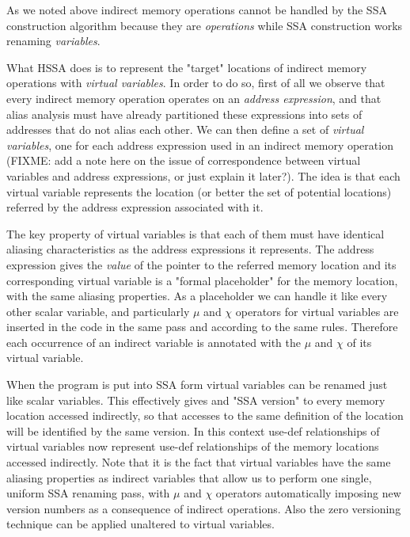 As we noted above indirect memory operations cannot be handled by the SSA construction algorithm because they are {\em operations} while SSA construction works renaming {\em variables}.

What HSSA does is to represent the "target" locations of indirect memory operations with {\em virtual variables}.
In order to do so, first of all we observe that every indirect memory operation operates on an {\em address expression}, and that alias analysis must have already partitioned these expressions into sets of addresses that do not alias each other.
We can then define a set of {\em virtual variables}, one for each address expression used in an indirect memory operation (FIXME: add a note here on the issue of correspondence between virtual variables and address expressions, or just explain it later?).
The idea is that each virtual variable represents the location (or better the set of potential locations) referred by the address expression associated with it.

The key property of virtual variables is that each of them must have identical aliasing characteristics as the address expressions it represents.
The address expression gives the {\em value} of the pointer to the referred memory location and its corresponding virtual variable is a "formal placeholder" for the memory location, with the same aliasing properties.
As a placeholder we can handle it like every other scalar variable, and particularly $\mu$ and $\chi$ operators for virtual variables are inserted in the code in the same pass and according to the same rules.
Therefore each occurrence of an indirect variable is annotated with the $\mu$ and $\chi$ of its virtual variable.

When the program is put into SSA form virtual variables can be renamed just like scalar variables.
This effectively gives and "SSA version" to every memory location accessed indirectly, so that accesses to the same definition of the location will be identified by the same version.
In this context use-def relationships of virtual variables now represent use-def relationships of the memory locations accessed indirectly.
Note that it is the fact that virtual variables have the same aliasing properties as indirect variables that allow us to perform one single, uniform SSA renaming pass, with $\mu$ and $\chi$ operators automatically imposing new version numbers as a consequence of indirect operations.
Also the zero versioning technique can be applied unaltered to virtual variables.

